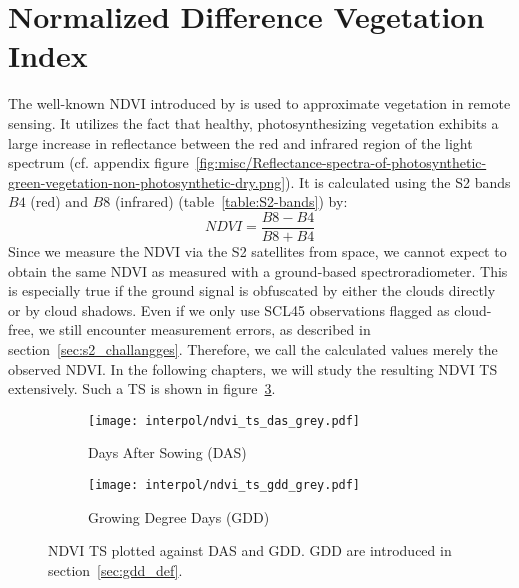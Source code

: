 \section{Normalized Difference Vegetation Index}{%
	The well-known {NDVI} introduced by \cite{rouseMonitoringVernalAdvancement1974} is used to approximate vegetation in remote sensing. It utilizes the fact that healthy, photosynthesizing vegetation exhibits a large increase in reflectance between the red and infrared region of the light spectrum (cf. appendix figure~\ref{fig:misc/Reflectance-spectra-of-photosynthetic-green-vegetation-non-photosynthetic-dry.png}). It is calculated using the S2 bands $B4$ (red) and $B8$ (infrared) (table~\ref{table:S2-bands}) by:
	\begin{equation}
		NDVI = \frac{B8 - B4}{B8 + B4}
		\label{eq:ndvi}
	\end{equation}
	Since we measure the NDVI via the S2 satellites from space, we cannot expect to obtain the same NDVI as measured with a ground-based spectroradiometer. This is especially true if the ground signal is obfuscated by either the clouds directly or by cloud shadows. Even if we only use SCL45 observations flagged as cloud-free, we still encounter measurement errors, as described in section~\ref{sec:s2_challangges}. Therefore, we call the calculated values merely the {observed NDVI}. In the following chapters, we will study the resulting NDVI {TS} extensively. Such a {TS} is shown in figure~\ref{fig:raw_ndvi_ts}.
	\begin{figure}[!h]
		\centering
		\begin{subfigure}{.47\textwidth}
			\texttt{[image: interpol/ndvi\_ts\_das\_grey.pdf]}
			\caption{Days After Sowing (DAS)}
			\label{interpol/ndvi_ts_das_grey.pdf}
		\end{subfigure}%
		\hfill
		\begin{subfigure}{.47\textwidth}
			\texttt{[image: interpol/ndvi\_ts\_gdd\_grey.pdf]}
			\caption{Growing Degree Days (GDD)}
			\label{interpol/ndvi_ts_gdd_grey.pdf}
		\end{subfigure}
		\vspace{0.3cm}
		\caption[NDVI {TS} plotted against DAS and GDD]{NDVI {TS} plotted against DAS and GDD. GDD are introduced in section~\ref{sec:gdd_def}.}
		\label{fig:raw_ndvi_ts}
	\end{figure}
}


